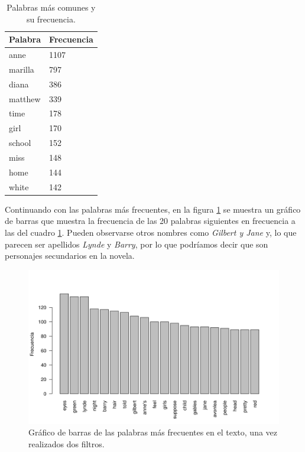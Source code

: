 \documentclass[12pt]{article}
\begin{document}
	\begin{table}
		\centering
		\caption{Palabras más comunes y su frecuencia.}
		\label{frecuencia_palabras}
		\begin{tabular}{l|l}
			\hline
			Palabra & Frecuencia \\
			\hline
			anne & 1107\\
			marilla & 797\\
			diana & 386\\
			matthew & 339\\
			time & 178\\
			girl & 170\\
			school & 152\\
			miss & 148\\
			home & 144\\
			white & 142\\
			\hline
		\end{tabular}
	\end{table}

	Continuando con las palabras más frecuentes, en la figura \ref{palabras_dec} se muestra un gráfico de barras que muestra la frecuencia de las 20 palabras siguientes en frecuencia a las del cuadro \ref{frecuencia_palabras}. Pueden observarse otros nombres como \textit{Gilbert y Jane} y, lo que parecen ser apellidos \textit{Lynde} y \textit{Barry}, por lo que podríamos decir que son personajes secundarios en la novela. 
	
	\begin{figure}
		\centering
		\includegraphics[scale=0.7]{palabras_decreciente_log3.png}
		\caption{Gráfico de barras de las palabras más frecuentes en el texto, una vez realizados dos filtros.}
		\label{palabras_dec}
	\end{figure}
	
\end{document}
